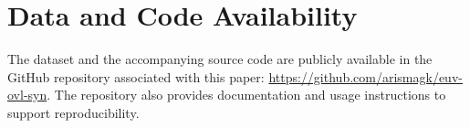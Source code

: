 \documentclass[10pt,conference]{IEEEtran}
\begin{document}
\section*{Data and Code Availability}
The dataset and the accompanying source code are publicly available in the GitHub repository associated with this paper: \url{https://github.com/arismagk/euv-ovl-syn}. The repository also provides documentation and usage instructions to support reproducibility.



\end{document}

